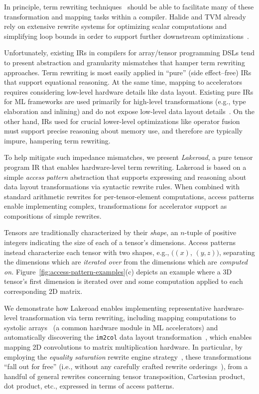 \documentclass[prologue, dvipsnames, sigplan, screen, review, anonymous]{acmart}
\newcommand{\g}{Lakeroad\xspace}
\newcommand{\accesspatternshape}[2]{$($$\left( #1 \right)$, $\left( #2 \right)$$)$}
\newcommand{\tcd}[1]{\texttt{#1}}
\begin{document}
In principle, term rewriting techniques~\cite{baader1998term}
  should be able to facilitate many of
  these transformation and mapping tasks
  within a compiler.
Halide and TVM already rely
  on extensive rewrite systems for
  optimizing scalar computations and
  simplifying loop bounds in order to
  support further downstream optimizations~\cite{newcomb2020halide-rewrite,
  hagedorn2020func-high-perf}.

Unfortunately, existing IRs in compilers for
  array/tensor programming DSLs tend to
  present abstraction and granularity mismatches
  that hamper term rewriting approaches.
Term rewriting is most easily applied in
  ``pure'' (side effect--free) IRs
  that support equational reasoning.
At the same time,
  mapping to accelerators requires considering
  low-level hardware details like data layout.
Existing pure IRs for ML frameworks are used
  primarily for high-level transformations
  (e.g., type elaboration and inlining)
  and do not expose low-level data layout details~\cite{
    relay}.
On the other hand,
  IRs used for crucial lower-level optimizations like
  operator fusion must support
  precise reasoning about memory use,
  and therefore are typically impure,
  hampering term rewriting.%

To help mitigate such impedance mismatches,
  we present \textit{\g}, a pure tensor program IR
  that enables hardware-level term rewriting.
\g is based on a simple
  \textit{access pattern} abstraction that
  supports expressing and reasoning about
  data layout transformations via
  syntactic rewrite rules.
When combined with standard arithmetic rewrites
  for per-tensor-element computations,
  access patterns enable implementing complex,
  transformations for accelerator support as
  compositions of simple rewrites.

Tensors are traditionally characterized
  by their \textit{shape},
  an $n$-tuple 
  of positive integers
  indicating the size of each
  of a tensor's dimensions.
Access patterns instead characterize
  each tensor with two shapes, e.g.,
  \accesspatternshape{x}{y, z}, separating
  the dimensions which are \textit{iterated over} from
  the dimensions which are \textit{computed on.}
Figure~\ref{fig:access-pattern-examples}(c)
  depicts an example where a 3D tensor's
  first dimension is iterated over and
  some computation applied to each
  corresponding 2D matrix.

We demonstrate how \g
  enables implementing representative
  hardware-level transformation via term rewriting,
  including mapping computations
  to systolic arrays~\cite{jouppi2017tpu}
  (a common hardware module in ML accelerators)
  and automatically discovering the
  \tcd{im2col} data layout transformation~\cite{im2col},
  which enables mapping 2D convolutions
  to matrix multiplication hardware.
In particular,
  by employing the \textit{equality saturation}
  rewrite engine strategy~\cite{willsey2021egg},
  these transformations ``fall out for free''
  (i.e., without any carefully crafted
  rewrite orderings~\cite{phase-ordering}),
  from a handful of general rewrites concerning tensor
  transposition, Cartesian product, dot product, etc.,
  expressed in terms of access patterns.
\end{document}
